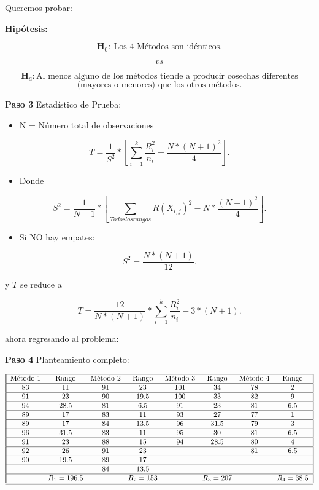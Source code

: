 \documentclass[
  a4paper,
  oneside,
  openany]{book}
\providecommand{\tightlist}{%
  \setlength{\itemsep}{0pt}\setlength{\parskip}{0pt}}
\begin{document}
Queremos probar:

\textbf{Hipótesis:}

\[\textbf{H}_0: \ \mbox{Los 4 Métodos son idénticos.}\]

\[vs\]

\[\textbf{H}_a: \mbox{Al menos alguno de los métodos tiende a producir cosechas diferentes}\]
\[\mbox{(mayores o menores) que los otros métodos.}\]

\textbf{Paso 3} Estadístico de Prueba:

\begin{itemize}
\tightlist
\item
  N = Número total de observaciones
\end{itemize}

\[T= \frac{1}{S^2}*\left[\sum_{i=1}^{k}\frac{R_{i}^2}{n_{i}} - \frac{N*(N+1)^2}{4}\right].\]

\begin{itemize}
\tightlist
\item
  Donde
\end{itemize}

\[ S^2 = \frac{1}{N-1}*\left[\sum_{Todos los rangos}R(X_{i,j})^2 - N*\frac{(N+1)^2}{4}\right].\]

\begin{itemize}
\tightlist
\item
  Si NO hay empates:
\end{itemize}

\[S^2= \frac{N*(N+1)}{12}.\]

y \(T\) se reduce a

\[T= \frac{12}{N*(N+1)}*\sum_{i=1}^{k}\frac{R_{i}^2}{n_{i}} - 3*(N+1).\]

ahora regresando al problema:

\textbf{Paso 4} Planteamiento completo:

\[
\begin{array}{||c c c c c c c c ||} 
\hline
\mbox{Método 1} & \mbox{Rango} & \mbox{Método 2} & \mbox{Rango}  & \mbox{Método 3} & \mbox{Rango} & \mbox{Método 4} & \mbox{Rango} \\  
\hline
83 & 11 &91 &23 &101 &34 &78 &2 \\ 
\hline
91 & 23 & 90&19.5 &100 &33 &82 &9 \\
\hline
94 &28.5  &81 &6.5 &91 &23 &81 &6.5 \\
\hline
89 & 17 &83 &11 &93 &27 &77 &1 \\
\hline
89 & 17 &84 &13.5 &96 &31.5 &79 &3 \\
\hline
96 & 31.5 &83 &11 &95 &30 &81 &6.5 \\
\hline
91 & 23 &88 &15 &94 &28.5 &80 &4 \\
\hline
92 & 26 &91 &23 & & &81 &6.5 \\
\hline
90 & 19.5 &89 &17 & & && \\
\hline
& &84 &13.5 & & & & \\
\hline
& R_1=196.5 & &R_2=153 & &R_3=207 & &R_4=38.5 \\
\hline
\hline
\end{array}
\]
\end{document}
